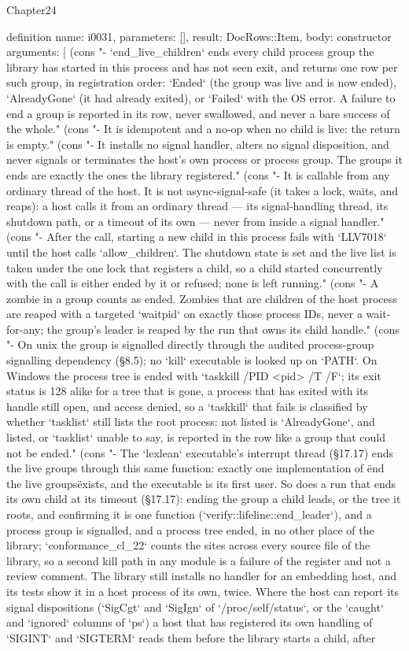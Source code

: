 \begin{lexlean}{Chapter24}
\begin{semanticmodule}
definition{
  name: i0031,
  parameters: [],
  result: DocRows::Item,
  body: constructor{
    arguments: [
      (cons "- `end_live_children` ends every child process group the library has started in this process and has not seen exit, and returns one row per such group, in registration order: `Ended` (the group was live and is now ended), `AlreadyGone` (it had already exited), or `Failed` with the OS error. A failure to end a group is reported in its row, never swallowed, and never a bare success of the whole." (cons "- It is idempotent and a no-op when no child is live: the return is empty." (cons "- It installs no signal handler, alters no signal disposition, and never signals or terminates the host's own process or process group. The groups it ends are exactly the ones the library registered." (cons "- It is callable from any ordinary thread of the host. It is not async-signal-safe (it takes a lock, waits, and reaps): a host calls it from an ordinary thread — its signal-handling thread, its shutdown path, or a timeout of its own — never from inside a signal handler." (cons "- After the call, starting a new child in this process fails with `LLV7018` until the host calls `allow_children`. The shutdown state is set and the live list is taken under the one lock that registers a child, so a child started concurrently with the call is either ended by it or refused; none is left running." (cons "- A zombie in a group counts as ended. Zombies that are children of the host process are reaped with a targeted `waitpid` on exactly those process IDs, never a wait-for-any; the group's leader is reaped by the run that owns its child handle." (cons "- On unix the group is signalled directly through the audited process-group signalling dependency (§8.5); no `kill` executable is looked up on `PATH`. On Windows the process tree is ended with `taskkill /PID <pid> /T /F`; its exit status is 128 alike for a tree that is gone, a process that has exited with its handle still open, and access denied, so a `taskkill` that fails is classified by whether `tasklist` still lists the root process: not listed is `AlreadyGone`, and listed, or `tasklist` unable to say, is reported in the row like a group that could not be ended." (cons "- The `lexlean` executable's interrupt thread (§17.17) ends the live groups through this same function: exactly one implementation of \"end the live groups\" exists, and the executable is its first user. So does a run that ends its own child at its timeout (§17.17): ending the group a child leads, or the tree it roots, and confirming it is one function (`verify::lifeline::end_leader`), and a process group is signalled, and a process tree ended, in no other place of the library; `conformance_cl_22` counts the sites across every source file of the library, so a second kill path in any module is a failure of the register and not a review comment. The library still installs no handler for an embedding host, and its tests show it in a host process of its own, twice. Where the host can report its signal dispositions (`SigCgt` and `SigIgn` of `/proc/self/status`, or the `caught` and `ignored` columns of `ps`) a host that has registered its own handling of `SIGINT` and `SIGTERM` reads them before the library starts a child, after }}
\end{semanticmodule}
\end{lexlean}
